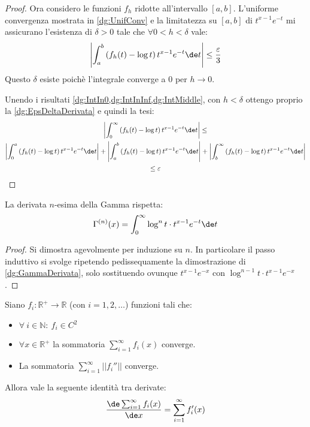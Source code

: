\begin{proof}
	Ora considero le funzioni $f_h$ ridotte all'intervallo $[a,b]$.
	L'uniforme convergenza mostrata in \cref{dg:UnifConv} e la limitatezza su $[a,b]$ di $t^{x-1}e^{-t}$ mi assicurano
	l'esistenza di $\delta>0$ tale che $\forall 0<h<\delta$ vale:
	\begin{equation}\label{dg:IntMiddle}
		\left\lvert \int_a^b \left(f_h(t)-\log{t}\right)t^{x-1}e^{-t}\de t\right\rvert \le \frac{\varepsilon}3
	\end{equation}
	Questo $\delta$ esiste poichè l'integrale converge a 0 per $h\to 0$.
	
	Unendo i risultati \cref{dg:IntIn0,dg:IntInInf,dg:IntMiddle}, con $h<\delta$ ottengo
	proprio la \cref{dg:EpsDeltaDerivata} e quindi la tesi:
	\begin{multline}
		\left\lvert
		\int_0^{\infty} \left(f_h(t)-\log{t}\right)t^{x-1}e^{-t}\de t
		\right\rvert \le \\
		\left\lvert \int_0^a \left(f_h(t)-\log{t}\right)t^{x-1}e^{-t}\de t\right\rvert +
		\left\lvert \int_a^b \left(f_h(t)-\log{t}\right)t^{x-1}e^{-t}\de t\right\rvert +
		\left\lvert \int_b^{\infty} \left(f_h(t)-\log{t}\right)t^{x-1}e^{-t}\de t\right\rvert \\
		\le \varepsilon
	\end{multline}
\end{proof}
\begin{corollary}\label{dg:GammaDerivataN}
	La derivata $n$-esima della Gamma rispetta:
	\begin{equation*}
		\Gamma^{(n)}(x)=\int_0^{\infty} \log^{n}{t}\cdot t^{x-1}e^{-t}\de t
	\end{equation*}
\end{corollary}
\begin{proof}
	Si dimostra agevolmente per induzione su $n$. In particolare il passo induttivo si svolge
	ripetendo pedissequamente la dimostrazione di \cref{dg:GammaDerivata}, solo sostituendo ovunque $t^{x-1}e^{-x}$
	con $\log^{n-1}{t}\cdot t^{x-1}e^{-x}$.
\end{proof}
\begin{lemma}\label{dg:SommaDer}
	Siano $f_i:\mathbb{R^+}\to\mathbb R$ (con $i=1,2,\dots$) funzioni tali che:
	\begin{itemize}
		\item $\forall\ i\in\mathbb{N} :\ f_i\in C^2$
		\item $\forall x\in \mathbb{R^+}$ la sommatoria $\sum_{i=1}^{\infty}f_i(x)$ converge.
		\item La sommatoria $\sum_{i=1}^{\infty} ||f_i''||$ converge.
	\end{itemize}
	
	Allora vale la seguente identità tra derivate:
	\begin{equation*}
		\frac{\de \sum_{i=1}^{\infty}f_i(x)}{\de x}=\sum_{i=1}^{\infty}f_i'(x)
	\end{equation*}
\end{lemma}
